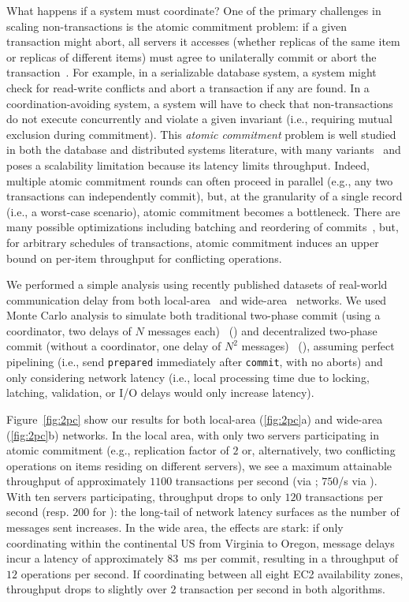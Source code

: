 What happens if a system must coordinate? One of the primary
challenges in scaling non-\cfree transactions is the atomic commitment
problem: if a given transaction might abort, all servers it accesses
(whether replicas of the same item or replicas of different items)
must agree to unilaterally commit or abort the
transaction~\cite{bernstein-book}. For example, in a serializable
database system, a system might check for read-write conflicts and
abort a transaction if any are found. In a coordination-avoiding
system, a system will have to check that non-\iconfluent transactions
do not execute concurrently and violate a given invariant (i.e.,
requiring mutual exclusion during commitment). This \textit{atomic
  commitment} problem is well studied in both the database and
distributed systems literature, with many
variants~\cite{atomictransactions,paxos-commit,traiger-tods} and poses
a scalability limitation because its latency limits
throughput. Indeed, multiple atomic commitment rounds can often
proceed in parallel (e.g., any two \iconfluent transactions can
independently commit), but, at the granularity of a single record
(i.e., a worst-case scenario), atomic commitment becomes a
bottleneck. There are many possible optimizations including batching
and reordering of commits~\cite{calvin}, but, for arbitrary schedules
of transactions, atomic commitment induces an upper bound on per-item
throughput for conflicting operations.

We performed a simple analysis using recently published datasets of
real-world communication delay from both local-area~\cite{bobtail} and
wide-area~\cite{hat-vldb} networks. We used Monte Carlo analysis to
simulate both traditional two-phase commit (using a coordinator, two
delays of $N$ messages each)~\cite{bernstein-book} (\cpc) and
decentralized two-phase commit (without a coordinator, one delay of
$N^2$ messages)~\cite{paxos-commit} (\dpc), assuming perfect
pipelining (i.e., send \texttt{prepared} immediately after
\texttt{commit}, with no aborts) and only considering network latency
(i.e., local processing time due to locking, latching, validation, or
I/O delays would only increase latency).

Figure~\ref{fig:2pc} show our results for both local-area
(\ref{fig:2pc}a) and wide-area (\ref{fig:2pc}b) networks.  In the
local area, with only two servers participating in atomic commitment
(e.g., replication factor of $2$ or, alternatively, two conflicting
operations on items residing on different servers), we see a maximum
attainable throughput of approximately $1100$ transactions per second
(via \dpc; $750$/s via \cpc). With ten servers participating, \dpc
throughput drops to only $120$ transactions per second (resp. $200$
for \cpc): the long-tail of network latency surfaces as the number of
messages sent increases. In the wide area, the effects are stark: if
only coordinating within the continental US from Virginia to Oregon,
\dpc message delays incur a latency of approximately $83$~ms per
commit, resulting in a throughput of $12$ operations per second. If
coordinating between all eight EC2 availability zones, throughput
drops to slightly over $2$ transaction per second in both algorithms.

